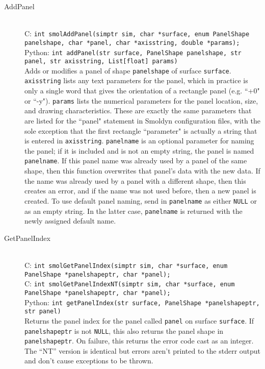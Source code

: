 \documentclass {book}
\begin{document}
\begin{description}
\item[AddPanel]
\hfill \\
C: \texttt{int smolAddPanel(simptr sim, char *surface, enum PanelShape panelshape, char *panel, char *axisstring, double *params);}\\
Python: \texttt{int addPanel(str surface, PanelShape panelshape, str panel, str axisstring, List[float] params)}\\
Adds or modifies a panel of shape \texttt{panelshape} of surface \texttt{surface}. \texttt{axisstring} lists any text parameters for the panel, which in practice is only a single word that gives the orientation of a rectangle panel (e.g. ``+0" or ``-y"). \texttt{params} lists the numerical parameters for the panel location, size, and drawing characteristics. These are exactly the same parameters that are listed for the ``panel" statement in Smoldyn configuration files, with the sole exception that the first rectangle ``parameter" is actually a string that is entered in \texttt{axisstring}. \texttt{panelname} is an optional parameter for naming the panel; if it is included and is not an empty string, the panel is named \texttt{panelname}. If this panel name was already used by a panel of the same shape, then this function overwrites that panel's data with the new data. If the name was already used by a panel with a different shape, then this creates an error, and if the name was not used before, then a new panel is created. To use default panel naming, send in \texttt{panelname} as either \texttt{NULL} or as an empty string. In the latter case, \texttt{panelname} is returned with the newly assigned default name.

\item[GetPanelIndex]
\hfill \\
C: \texttt{int smolGetPanelIndex(simptr sim, char *surface, enum PanelShape *panelshapeptr, char *panel);}\\
C: \texttt{int smolGetPanelIndexNT(simptr sim, char *surface, enum PanelShape *panelshapeptr, char *panel);}\\
Python: \texttt{int getPanelIndex(str surface, PanelShape *panelshapeptr, str panel)}\\
Returns the panel index for the panel called \texttt{panel} on surface \texttt{surface}. If \texttt{panelshapeptr} is not \texttt{NULL}, this also returns the panel shape in \texttt{panelshapeptr}. On failure, this returns the error code cast as an integer. The ``NT'' version is identical but errors aren't printed to the stderr output and don't cause exceptions to be thrown.


\end{description}
\end{document}

